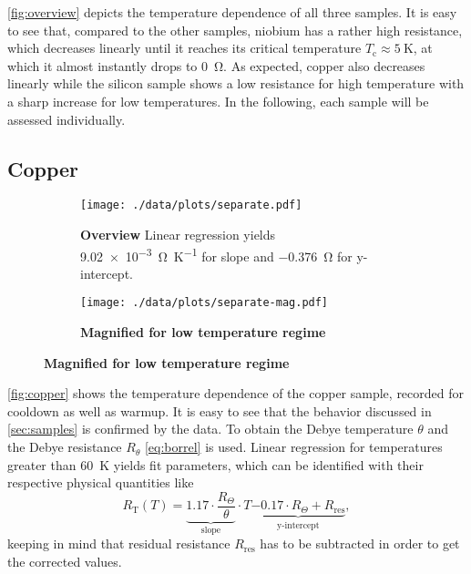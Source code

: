 \autoref{fig:overview} depicts the temperature dependence of all three samples.
It is easy to see that, compared to the other samples, niobium has a rather high resistance, which decreases linearly until it reaches its critical temperature $T_\text{c}\approx\SI{5}{\kelvin}$, at which it almost instantly drops to \SI{0}{\ohm}.
As expected, copper also decreases linearly while the silicon sample shows a low resistance for high temperature with a sharp increase for low temperatures.
In the following, each sample will be assessed individually.

\subsection{Copper}\label{sec:copper}
\begin{figure}
\begin{adjustwidth}{-1cm}{-1cm}
	\centering
	\begin{subfigure}{.55\textwidth}
		\centering
		\texttt{[image: ./data/plots/separate.pdf]}
		\caption{\textbf{Overview} Linear regression yields \SI{9.02e-3}{\ohm\per\kelvin} for slope and \SI{-0.376}{\ohm} for y-intercept.}
	\end{subfigure}
	\hfill
	\begin{subfigure}{.55\textwidth}
		\centering
		\texttt{[image: ./data/plots/separate-mag.pdf]}
		\caption{\textbf{Magnified for low temperature regime}}
	\end{subfigure}
	\label{fig:copper}
\end{adjustwidth}
\end{figure}

\autoref{fig:copper} shows the temperature dependence of the copper sample, recorded for cooldown as well as warmup.
It is easy to see that the behavior discussed in \autoref{sec:samples} is confirmed by the data.
To obtain the Debye temperature $\theta$ and the Debye resistance $R_\theta$ \autoref{eq:borrel} is used.
Linear regression for temperatures greater than \SI{60}{\kelvin} yields fit parameters, which can be identified with their respective physical quantities like
\begin{equation*}
	R_\text{T}(T) = \underbrace{\num{1.17} \cdot \frac{R_\Theta}{\theta}}_\text{slope} \cdot T \underbrace{- \num{0.17} \cdot R_\Theta + R_\text{res}}_\text{y-intercept},
\end{equation*}
keeping in mind that residual resistance $R_\text{res}$ has to be subtracted in order to get the corrected values.

